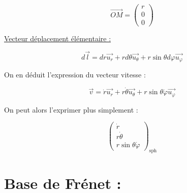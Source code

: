 \documentclass{article}
\begin{document}
$$
\boxed{\overrightarrow{OM}=\left(\begin{array}{c}r\\0\\0\end{array}\right)}
$$

\underline{Vecteur déplacement élémentaire :}

$$
d\overrightarrow{l}=dr\overrightarrow{u_r}+rd\theta\overrightarrow{u_\theta}+r\sin\theta d\varphi\overrightarrow{u_\varphi}
$$

On en déduit l'expression du vecteur vitesse :

$$
\boxed{\overrightarrow{v}=\dot{r}\overrightarrow{u_r}+r\dot{\theta}\overrightarrow{u_\theta}+r\sin\theta\dot{\varphi}\overrightarrow{u_\varphi}}
$$

On peut alors l'exprimer plus simplement :

$$\left(\begin{array}{c}\dot{r}\\r\dot{\theta}\\r\sin\theta\dot{\varphi}\end{array}\right)_\text{sph}$$

\section{Base de Frénet :}
\end{document}
